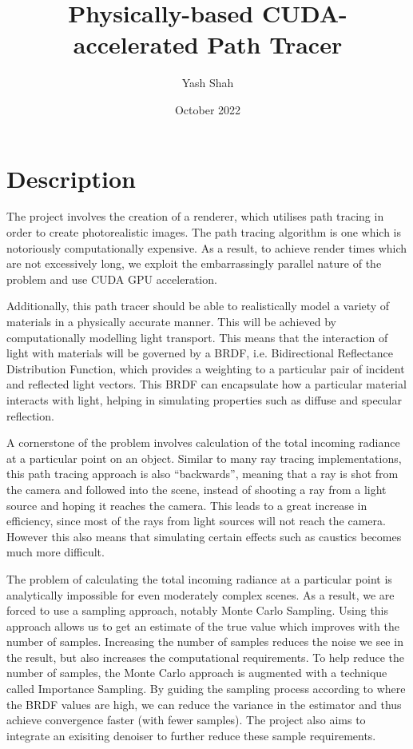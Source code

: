 \documentclass[12pt, a4paper]{article}
\title{Physically-based CUDA-accelerated Path Tracer}
\author{Yash Shah}
\date{October 2022}
\begin{document}
    \maketitle
    
    \section*{Description}
    The project involves the creation of a renderer, which utilises path tracing in order to create photorealistic images. The path tracing algorithm is one which is notoriously computationally expensive. As a result, to achieve render times which are not excessively long, we exploit the embarrassingly parallel nature of the problem and use CUDA GPU acceleration.

    Additionally, this path tracer should be able to realistically model a variety of materials in a physically accurate manner. This will be achieved by computationally modelling light transport. This means that the interaction of light with materials will be governed by a BRDF, i.e. Bidirectional Reflectance Distribution Function, which provides a weighting to a particular pair of incident and reflected light vectors. This BRDF can encapsulate how a particular material interacts with light, helping in simulating properties such as diffuse and specular reflection.

    A cornerstone of the problem involves calculation of the total incoming radiance at a particular point on an object. Similar to many ray tracing implementations, this path tracing approach is also “backwards”, meaning that a ray is shot from the camera and followed into the scene, instead of shooting a ray from a light source and hoping it reaches the camera. This leads to a great increase in efficiency, since most of the rays from light sources will not reach the camera. However this also means that simulating certain effects such as caustics becomes much more difficult.

    The problem of calculating the total incoming radiance at a particular point is analytically impossible for even moderately complex scenes. As a result, we are forced to use a sampling approach, notably Monte Carlo Sampling. Using this approach allows us to get an estimate of the true value which improves with the number of samples. Increasing the number of samples reduces the noise we see in the result, but also increases the computational requirements. To help reduce the number of samples, the Monte Carlo approach is augmented with a technique called Importance Sampling. By guiding the sampling process according to where the BRDF values are high, we can reduce the variance in the estimator and thus achieve convergence faster (with fewer samples). The project also aims to integrate an exisiting denoiser to further reduce these sample requirements.
\end{document}
